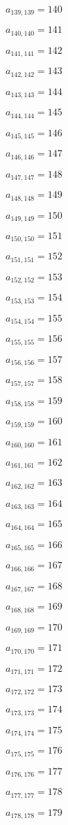 \documentclass[a4paper,12pt]{article}
\begin{document}
$a _{ 139, 139 } = 140$

$a _{ 140, 140 } = 141$

$a _{ 141, 141 } = 142$

$a _{ 142, 142 } = 143$

$a _{ 143, 143 } = 144$

$a _{ 144, 144 } = 145$

$a _{ 145, 145 } = 146$

$a _{ 146, 146 } = 147$

$a _{ 147, 147 } = 148$

$a _{ 148, 148 } = 149$

$a _{ 149, 149 } = 150$

$a _{ 150, 150 } = 151$

$a _{ 151, 151 } = 152$

$a _{ 152, 152 } = 153$

$a _{ 153, 153 } = 154$

$a _{ 154, 154 } = 155$

$a _{ 155, 155 } = 156$

$a _{ 156, 156 } = 157$

$a _{ 157, 157 } = 158$

$a _{ 158, 158 } = 159$

$a _{ 159, 159 } = 160$

$a _{ 160, 160 } = 161$

$a _{ 161, 161 } = 162$

$a _{ 162, 162 } = 163$

$a _{ 163, 163 } = 164$

$a _{ 164, 164 } = 165$

$a _{ 165, 165 } = 166$

$a _{ 166, 166 } = 167$

$a _{ 167, 167 } = 168$

$a _{ 168, 168 } = 169$

$a _{ 169, 169 } = 170$

$a _{ 170, 170 } = 171$

$a _{ 171, 171 } = 172$

$a _{ 172, 172 } = 173$

$a _{ 173, 173 } = 174$

$a _{ 174, 174 } = 175$

$a _{ 175, 175 } = 176$

$a _{ 176, 176 } = 177$

$a _{ 177, 177 } = 178$

$a _{ 178, 178 } = 179$
\end{document}
